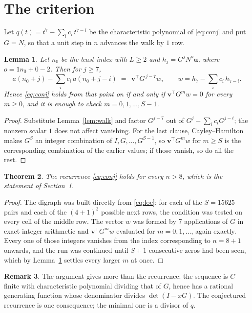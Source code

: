 \documentclass[11pt,a4paper]{article}
\theoremstyle{plain}
\newtheorem{theorem}{Theorem}
\newtheorem{lemma}[theorem]{Lemma}
\theoremstyle{definition}
\newtheorem{remark}[theorem]{Remark}
\begin{document}
\section{The criterion}

Let $q(t)=t^{7}-\sum_i c_i\,t^{7-i}$ be the characteristic polynomial of
\eqref{eq:conj} and put $G=N$, so that a unit step in $n$ advances the walk by
$1$ row.

\begin{lemma}\label{lem:crit}
Let $n_0$ be the least index with $L\ge2$ and $h_j=G^{j}N^{o}\mathbf{u}$, where
$o=1n_0+0-2$. Then for $j\ge7$,
\[
a(n_0+j)-\sum_i c_i\,a(n_0+j-i)\;=\;\,\mathbf{v}^{\!\top}G^{\,j-7}w,
\qquad w=h_{7}-\sum_i c_i\,h_{7-i} .
\]
Hence \eqref{eq:conj} holds from that point on if and only if
$\mathbf{v}^{\!\top}G^{m}w=0$ for every $m\ge0$, and it is enough to check
$m=0,1,\dots,S-1$.
\end{lemma}

\begin{proof}
Substitute Lemma~\ref{lem:walk} and factor $G^{j-7}$ out of
$G^{j}-\sum_ic_iG^{j-i}$; the nonzero scalar $1$ does not affect
vanishing. For the last clause, Cayley--Hamilton makes $G^{S}$ an integer combination of
$I,G,\dots,G^{S-1}$, so $\mathbf{v}^{\!\top}G^{m}w$ for $m\ge S$ is the corresponding
combination of the earlier values; if those vanish, so do all the rest.
\end{proof}

\begin{theorem}
The recurrence \eqref{eq:conj} holds for every $n>8$, which is the statement of
Section~1.
\end{theorem}

\begin{proof}
The digraph was built directly from \eqref{eq:loc}: for each of the $S=15625$ pairs and each
of the $(4+1)^{3}$ possible next rows, the condition was tested on every cell of
the middle row. The vector $w$ was formed by $7$ applications of $G$ in exact integer
arithmetic and $\mathbf{v}^{\!\top}G^{m}w$ evaluated for $m=0,1,\dots$, again exactly.
Every one of those integers vanishes from the index corresponding to $n=8+1$ onwards,
and the run was continued until $S+1$ consecutive zeros had been seen, which by
Lemma~\ref{lem:crit} settles every larger $m$ at once.
\end{proof}

\begin{remark}
The argument gives more than the recurrence: the sequence is $C$-finite with characteristic
polynomial dividing that of $G$, hence has a rational generating function whose denominator
divides $\det(I-xG)$. The conjectured recurrence is one consequence; the minimal one is a
divisor of $q$.
\end{remark}
\end{document}

